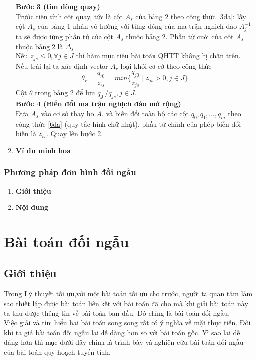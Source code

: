 \documentclass{article}
\begin{document}
\begin{enumerate}
\begin{equation}
                                    \end{equation}
                            \textbf{Bước 3 (tìm dòng quay)}\\
                                Trước tiên tính cột quay, tức là cột $A_s$ của bảng 2 theo công thức \eqref{3da}: lấy cột $A_s$ của bảng 1 nhân vô hướng với từng dòng của ma trận nghịch đảo $A_j^{-1}$ ta sẽ được từng phần tử của cột $A_s$ thuộc bảng 2. Phần từ cuối của cột $A_s$ thuộc bảng 2 là $\Delta_s$\\
                                Nếu $z_{js} \leq 0, \forall j \in J$ thì hàm mục tiêu bài toán QHTT không bị chặn trên. Nếu trái lại ta xác định vector $A_r$ loại khỏi cơ cở theo công thức
                                    \begin{equation}
                                        \theta_r=\frac{q_{r0}}{z_{rs}}=min\{ \frac{q_{j0}}{z_{js}} \mid z_{js} > 0,j \in J \}
                                    \end{equation}
                                Cột $\theta$ trong bảng 2 để lưu $q_{j0}/q_{js},j \in J$.\\
                            \textbf{Bước 4 (Biến đổi ma trận nghịch đảo mở rộng)}\\
                                Đưa $A_s$ vào cơ sở thay ho $A_r$ và biến đổi toàn bộ các cột $q_0,q_1,\ldots,q_m$ theo công thức \eqref{6da} (quy tắc hình chữ nhật), phần tử chính của phép biến đổi biến là $z_{rs}$. Quay lên bước 2. 
                    \item \textbf{Ví dụ minh hoạ} \\
                \end{enumerate}
            \subsubsection{Phương pháp đơn hình đối ngẫu}
                \begin{enumerate}
                    \item \textbf{Giới thiệu} \\
                    \item \textbf{Nội dung} \\
                \end{enumerate}

\section{Bài toán đối ngẫu}
    \subsection{Giới thiệu}
        Trong Lý thuyết tối ưu,với một bài toán tối ưu cho trước, người ta quan tâm làm sao thiết lập được bài toán liên kết với bài toán đã cho mà khi giải bài toán này ta thu được thông tin về bài toán ban đầu. Đó chíng là bài toán đối ngẫu. \\
        Việc giải và tìm hiểu hai bài toán song song rất có ý nghĩa về mặt thực tiễn. Đôi khi ta giả bài toán đối ngẫu lại dễ dàng hơn so với bài toán gốc. Vì sao lại dễ dàng hơn thì mục dưới đây chính là trình bày và nghiên cứu bài toán đối ngẫu của bài toán quy hoạch tuyến tính.
\end{document}
